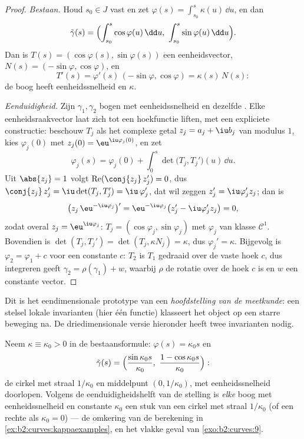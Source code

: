 \begin{proof}
\emph{Bestaan.} Houd $s_0 \in J$ vast en zet $\varphi(s) =
\int_{s_0}^s \kappa(u)\,\dd u$, en dan
\[
\tilde\gamma(s) = \Bigl(\int_{s_0}^s \cos\varphi(u)\,\dd u,\
\int_{s_0}^s \sin\varphi(u)\,\dd u\Bigr).
\]
Dan is $T(s) = (\cos\varphi(s), \sin\varphi(s))$ een
eenheidsvector, $N(s) = (-\sin\varphi, \cos\varphi)$, en
\[
T'(s) = \varphi'(s)\,(-\sin\varphi, \cos\varphi)
= \kappa(s)\,N(s) :
\]
de boog heeft eenheidssnelheid en  $\kappa$.

\emph{Eenduidigheid.} Zijn $\gamma_1, \gamma_2$ bogen met
eenheidssnelheid en dezelfde . Elke eenheidsraakvector laat
zich tot een hoekfunctie liften, met een expliciete constructie:
beschouw $T_j$ als het complexe getal $z_j = a_j + \iu b_j$ van
modulus $1$, kies $\varphi_j(0)$ met $z_j(0) =
\eu^{\iu\varphi_j(0)}$, en zet
\[
\varphi_j(s) = \varphi_j(0) + \int_0^s\det\bigl(T_j,
T_j'\bigr)(u)\,\dd u .
\]
Uit $\abs{z_j} = 1$ volgt $\operatorname{Re}(\conj{z_j}\,z_j') =
0$, dus $\conj{z_j}\,z_j' = \iu\det(T_j, T_j') = \iu\,\varphi_j'$,
dat wil zeggen $z_j' = \iu\varphi_j'z_j$; dan is
\[
\bigl(z_j\,\eu^{-\iu\varphi_j}\bigr)'
= \eu^{-\iu\varphi_j}\bigl(z_j' - \iu\varphi_j'z_j\bigr) = 0,
\]
zodat overal $z_j = \eu^{\iu\varphi_j}$: $T_j = (\cos\varphi_j,
\sin\varphi_j)$ met $\varphi_j$ van klasse $\mathcal C^1$.
Bovendien is $\det(T_j, T_j') = \det(T_j, \kappa N_j) = \kappa$,
dus $\varphi_j' = \kappa$. Bijgevolg is $\varphi_2 = \varphi_1 + c$
voor een constante $c$: $T_2$ is $T_1$ gedraaid over de vaste hoek
$c$, dus integreren geeft $\gamma_2 = \rho(\gamma_1) + w$, waarbij
$\rho$ de rotatie over de hoek $c$ is en $w$ een constante vector.
\end{proof}

\begin{remark}
Dit is het eendimensionale prototype van een
\emph{hoofdstelling van de meetkunde}: een  stelsel lokale
invarianten (hier één functie) klasseert het object op een starre
beweging na. De driedimensionale versie hieronder heeft twee
invarianten nodig.
\end{remark}

\begin{example}\label{ex:b2:curves:constantkappa}
Neem $\kappa \equiv \kappa_0 > 0$ in de bestaansformule: $\varphi(s)
= \kappa_0 s$ en
\[
\tilde\gamma(s) = \Bigl(\frac{\sin\kappa_0s}{\kappa_0},\
\frac{1 - \cos\kappa_0s}{\kappa_0}\Bigr) :
\]
de cirkel met straal $1/\kappa_0$ en middelpunt $(0, 1/\kappa_0)$,
met eenheidssnelheid doorlopen. Volgens de eenduidigheidshelft van
de stelling is \emph{elke} boog met eenheidssnelheid en constante
\omterm{thm:b2:curves:frenet2d}{kromming} $\kappa_0$ een stuk van een cirkel met straal
$1/\kappa_0$ (of een rechte als $\kappa_0 = 0$) --- de omkering van
de berekening in \cref{ex:b2:curves:kappaexamples}, en het vlakke
geval van \cref{exo:b2:curves:9}.
\end{example}

